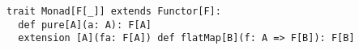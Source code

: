 \begin{algorithm}

\begin{verbatim}
trait Monad[F[_]] extends Functor[F]:
  def pure[A](a: A): F[A]
  extension [A](fa: F[A]) def flatMap[B](f: A => F[B]): F[B]
\end{verbatim}

\caption{Monad type class in Scala 3. %
\label{monad:scala}}
\end{algorithm}